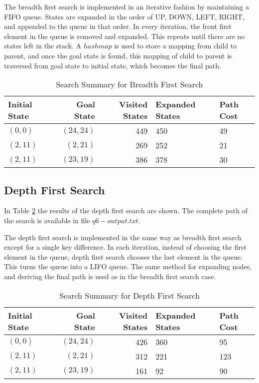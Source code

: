 \documentclass{article}
\begin{document}
    The breadth first search is implemented in an iterative fashion by maintaining a FIFO queue. States are expanded in the order of UP, DOWN, LEFT, RIGHT, and appended to the queue in that order. In every iteration, the front first element in the queue is removed and expanded. This repeats until there are no states left in the stack. A $hashmap$ is used to store a mapping from child to parent, and once the goal state is found, this mapping of child to parent is traversed from goal state to initial state, which becomes the final path.
    \begin{table}[!htp]\centering
        \caption{Search Summary for Breadth First Search}\label{tab:bfs6}
        \scriptsize
        \begin{tabular}{lrrll}\toprule
        Initial State &Goal State &Visited States&Expanded States&Path Cost  \\\midrule
        $(0,0)$ & $(24,24)$ & 449 & 450 & 49 \\
        $(2, 11)$ & $(2, 21)$ & 269 & 252 & 21 \\
        $(2, 11)$ & $(23, 19)$ & 386 & 378 & 30 \\
    \end{tabular}
    \end{table}


\subsection{Depth First Search}
    In Table \ref{tab:dfs6} the results of the depth first search are shown. The complete path of the search is available in file $q6-output.txt$.
    \setlength{\parskip}{6pt}
    
    The depth first search is implemented in the same way as breadth first search except for a single key difference. In each iteration, instead of choosing the first element in the queue, depth first search chooses the last element in the queue. This turns the queue into a LIFO queue. The same method for expanding nodes, and deriving the final path is used as in the breadth first search case.
    \begin{table}[!htp]\centering
        \caption{Search Summary for Depth First Search}\label{tab:dfs6}
        \scriptsize
        \begin{tabular}{lrrll}\toprule
        Initial State &Goal State &Visited States&Expanded States&Path Cost  \\\midrule
        $(0,0)$ & $(24,24)$ & 426 & 360 & 95 \\
        $(2, 11)$ & $(2, 21)$ & 312 & 221 & 123 \\
        $(2, 11)$ & $(23, 19)$ & 161 & 92 & 90 \\
    \end{tabular}
    \end{table}
\end{document}
